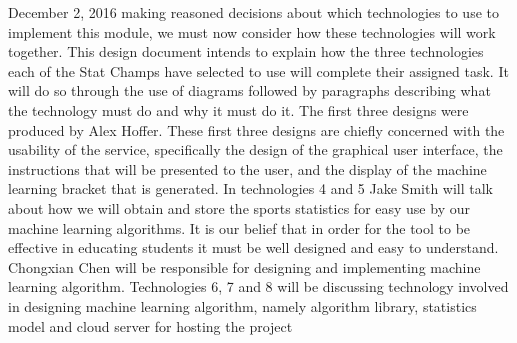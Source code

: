 \documentclass[journal,onecolumn]{IEEEtran}
\begin{document}
\hfill December 2, 2016
 making reasoned decisions about which technologies to use to implement this module, we must now consider how these technologies will work together. This design document intends to explain how the three technologies each of the Stat Champs have selected to use will complete their assigned task. It will do so through the use of diagrams followed by paragraphs describing what the technology must do and why it must do it. The first three designs were produced by Alex Hoffer. These first three designs are chiefly concerned with the usability of the service, specifically the design of the graphical user interface, the instructions that will be presented to the user, and the display of the machine learning bracket that is generated. In technologies 4 and 5 Jake Smith will talk about how we will obtain and store the sports statistics for easy use by our machine learning algorithms. It is our belief that in order for the tool to be effective in educating students it must be well designed and easy to understand. Chongxian Chen will be responsible for designing and implementing machine learning algorithm. Technologies 6, 7 and 8  will be discussing technology involved in designing machine learning algorithm, namely algorithm library, statistics model and cloud server for hosting the project %
\end{document}
